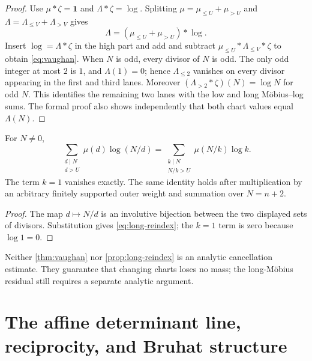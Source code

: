 \begin{proof}
Use $\mu*\zeta=\mathbf1$ and $\Lambda*\zeta=\log$.  Splitting
$\mu=\mu_{\le U}+\mu_{>U}$ and
$\Lambda=\Lambda_{\le V}+\Lambda_{>V}$ gives
\[
 \Lambda=(\mu_{\le U}+\mu_{>U})*\log.
\]
Insert $\log=\Lambda*\zeta$ in the high part and add and subtract
$\mu_{\le U}*\Lambda_{\le V}*\zeta$ to obtain \cref{eq:vaughan}.  When $N$ is
odd, every divisor of $N$ is odd.  The only odd integer at most $2$ is $1$, and
$\Lambda(1)=0$; hence $\Lambda_{\le2}$ vanishes on every divisor appearing in
the first and third lanes.  Moreover
$(\Lambda_{>2}*\zeta)(N)=\log N$ for odd $N$.  This identifies the remaining
two lanes with the low and long M\"obius--log sums.  The formal proof also
shows independently that both chart values equal $\Lambda(N)$.
\end{proof}

\begin{proposition}\label{prop:long-reindex}
For $N\ne0$,
\begin{equation}\label{eq:long-reindex}
 \sum_{\substack{d\mid N\\d>U}}\mu(d)\log(N/d)
 =\sum_{\substack{k\mid N\\N/k>U}}\mu(N/k)\log k.
\end{equation}
The term $k=1$ vanishes exactly.  The same identity holds after multiplication
by an arbitrary finitely supported outer weight and summation over $N=n+2$.
\end{proposition}

\begin{proof}
The map $d\mapsto N/d$ is an involutive bijection between the two displayed
sets of divisors.  Substitution gives \cref{eq:long-reindex}; the $k=1$ term is
zero because $\log1=0$.
\end{proof}

\begin{warning}
Neither \cref{thm:vaughan} nor \cref{prop:long-reindex} is an analytic
cancellation estimate.  They guarantee that changing charts loses no mass; the
long-M\"obius residual still requires a separate analytic argument.
\end{warning}

\section{The affine determinant line, reciprocity, and Bruhat structure}\label{sec:affine}

